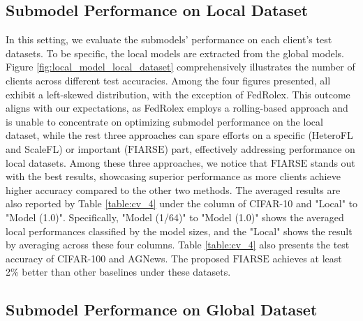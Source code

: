 \documentclass{article}
\theoremstyle{plain}
\theoremstyle{definition}
\theoremstyle{remark}
\newcommand{\algo}{\ensuremath{\text{FIARSE}}\xspace}
\begin{document}
\subsection{Submodel Performance on Local Dataset}
In this setting, we evaluate the submodels' performance on each client's test datasets. To be specific, the local models are extracted from the global models. Figure \ref{fig:local_model_local_dataset} comprehensively illustrates the number of clients across different test accuracies. Among the four figures presented, all exhibit a left-skewed distribution, with the exception of FedRolex. This outcome aligns with our expectations, as FedRolex employs a rolling-based approach and is unable to concentrate on optimizing submodel performance on the local dataset, while the rest three approaches can spare efforts on a specific (HeteroFL and ScaleFL) or important (\algo) part, effectively addressing performance on local datasets. Among these three approaches, we notice that \algo stands out with the best results, showcasing superior performance as more clients achieve higher accuracy compared to the other two methods. The averaged results are also reported by Table \ref{table:cv_4} under the column of CIFAR-10 and "Local" to "Model (1.0)". Specifically, "Model (1/64)" to "Model (1.0)" shows the averaged local performances classified by the model sizes, and the "Local" shows the result by averaging across these four columns. Table \ref{table:cv_4} also presents the test accuracy of CIFAR-100 and AGNews. The proposed \algo achieves at least 2\% better than other baselines under these datasets.





\subsection{Submodel Performance on Global Dataset} \label{subsec:submodel_global}
\end{document}
